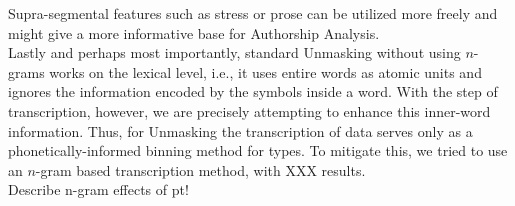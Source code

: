 Supra-segmental features such as stress or prose can be utilized more freely and might give a more informative base for Authorship Analysis.\\
Lastly and perhaps most importantly, standard Unmasking without using $n$-grams works on the lexical level, i.e., it uses entire words as atomic units and ignores the information encoded by the symbols inside a word.
With the step of transcription, however, we are precisely attempting to enhance this inner-word information.
Thus, for Unmasking the transcription of data serves only as a phonetically-informed binning method for types.
To mitigate this, we tried to use an $n$-gram based transcription method, with XXX results.\\



Describe n-gram effects of pt!


